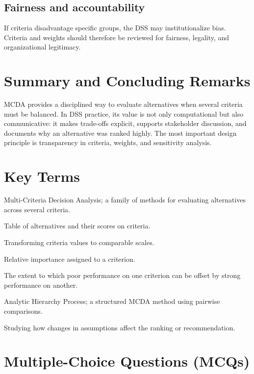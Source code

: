 \subsection{Fairness and accountability}
If criteria disadvantage specific groups, the DSS may institutionalize bias.
Criteria and weights should therefore be reviewed for fairness, legality, and
organizational legitimacy.

\section{Summary and Concluding Remarks}

MCDA provides a disciplined way to evaluate alternatives when several criteria
must be balanced. In DSS practice, its value is not only computational but also
communicative: it makes trade-offs explicit, supports stakeholder discussion,
and documents why an alternative was ranked highly. The most important design
principle is transparency in criteria, weights, and sensitivity analysis.

\section{Key Terms}
\begin{description}[style=nextline]
  \item[MCDA] Multi-Criteria Decision Analysis; a family of methods for
  evaluating alternatives across several criteria.
  \item[Decision matrix] Table of alternatives and their scores on criteria.
  \item[Normalization] Transforming criteria values to comparable scales.
  \item[Weight] Relative importance assigned to a criterion.
  \item[Compensability] The extent to which poor performance on one criterion
  can be offset by strong performance on another.
  \item[AHP] Analytic Hierarchy Process; a structured MCDA method using pairwise
  comparisons.
  \item[Sensitivity analysis] Studying how changes in assumptions affect the
  ranking or recommendation.
\end{description}

\section{Multiple-Choice Questions (MCQs)}

